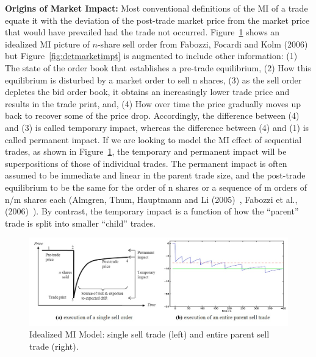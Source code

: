 \noindent \textbf{Origins of Market Impact:} Most conventional definitions of the MI of a trade equate it with the deviation of the post-trade market price from the market price that would have prevailed had the trade not occurred. Figure~\ref{fig:marketimpt} shows an idealized MI picture of $n$-share sell order from Fabozzi, Focardi and Kolm (2006)~\cite{ffk} but Figure~\ref{fig:detmarketimpt} is augmented to include other information:  (1) The state of the order book that establishes a pre-trade equilibrium, (2) How this equilibrium is disturbed by a market order to sell n shares, (3) as the sell order depletes the bid order book, it obtains an increasingly lower trade price and results in the trade print, and, (4) How over time the price gradually moves up back to recover some of the price drop. Accordingly, the difference between (4) and (3) is called temporary impact, whereas the difference between (4) and (1) is called permanent impact. If we are looking to model the MI effect of sequential trades, as shown in Figure~\ref{fig:marketimpt}, the temporary and permanent impact will be superpositions of those of individual trades. The permanent impact is often assumed to be immediate and linear in the parent trade size, and the post-trade equilibrium to be the same for the order of n shares or a sequence of m orders of n/m shares each (Almgren, Thum, Hauptmann and Li (2005)~\cite{athl}, Fabozzi et al., (2006)~\cite{ffk}). By contrast, the temporary impact is a function of how the ``parent'' trade is split into smaller ``child'' trades.
	\begin{figure}[!ht]
	\centering
	\includegraphics[width=\textwidth]{chapters/chapter_exec_models/figures/fig1ab.jpg}
	\caption{Idealized MI Model: single sell trade (left) and entire parent sell trade (right). \label{fig:marketimpt}}
	\end{figure}


